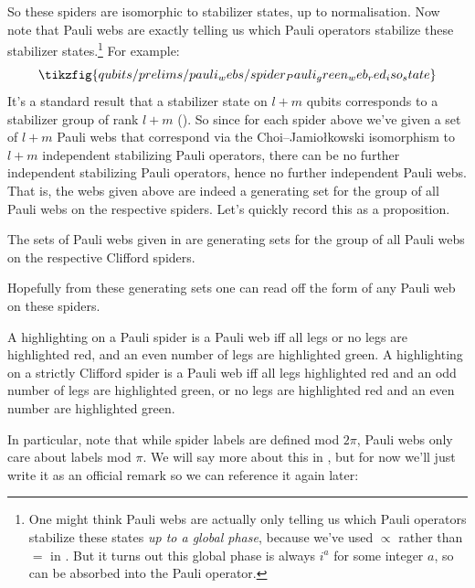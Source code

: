 So these spiders are isomorphic to stabilizer states, up to normalisation.
Now note that Pauli webs are exactly telling us which Pauli operators stabilize these stabilizer states.\footnote{One might think Pauli webs are actually only telling us which Pauli operators stabilize these states \textit{up to a global phase}, because we've used $\propto$ rather than $=$ in . But it turns out this global phase is always $i^a$ for some integer $a$, so can be absorbed into the Pauli operator.}
For example:
\begin{equation}\label{eq:spider_Pauli_green_web_red_iso_state}
    \tikzfig{qubits/prelims/pauli_webs/spider_Pauli_green_web_red_iso_state}
\end{equation}
It's a standard result that a stabilizer state on $l+m$ qubits corresponds to a stabilizer group of rank $l+m$ ().
So since for each spider above we've given a set of $l+m$ Pauli webs that correspond via the Choi–Jamiołkowski isomorphism to $l+m$ independent stabilizing Pauli operators, there can be no further independent stabilizing Pauli operators, hence no further independent Pauli webs.
That is, the webs given above are indeed a generating set for the group of all Pauli webs on the respective spiders.
Let's quickly record this as a proposition.
\begin{proposition}
    The sets of Pauli webs given in  are generating sets for the group of all Pauli webs on the respective Clifford spiders.
\end{proposition}

Hopefully from these generating sets one can read off the form of any Pauli web on these spiders.

\begin{proposition}
    A highlighting on a Pauli spider is a Pauli web iff all legs or no legs are highlighted red, and an even number of legs are highlighted green.
    A highlighting on a strictly Clifford spider is a Pauli web iff all legs highlighted red and an odd number of legs are highlighted green, or no legs are highlighted red and an even number are highlighted green.
\end{proposition}

In particular, note that while spider labels are defined mod $2\pi$, Pauli webs only care about labels mod $\pi$.
We will say more about this in , but for now we'll just write it as an official remark so we can reference it again later:


